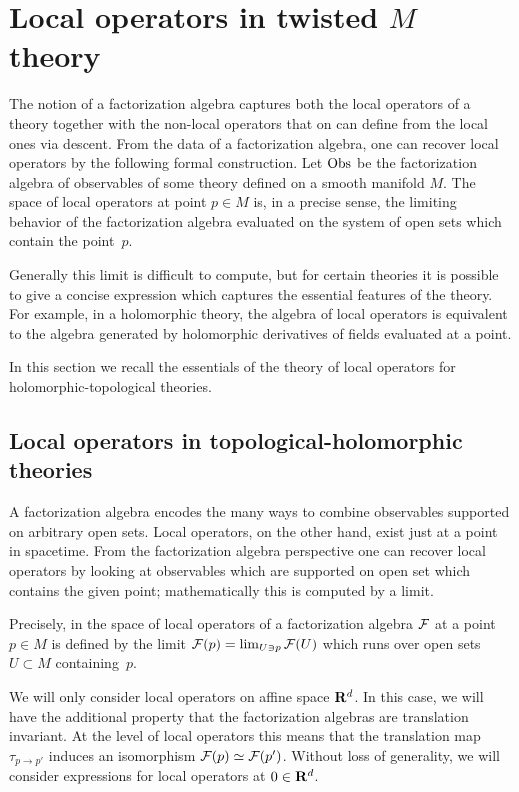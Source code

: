 %
%
%

\section{Local operators in twisted $M$ theory}

The notion of a factorization algebra captures both the local operators of a theory together with the non-local operators that on can define from the local ones via descent.
From the data of a factorization algebra, one can recover local operators by the following formal construction. 
Let $\operatorname{Obs}$ be the factorization algebra of observables of some theory defined on a smooth manifold $M$.
The space of local operators at point $p \in M$ is, in a precise sense, the limiting behavior of the factorization algebra evaluated on the system of open sets which contain the point~$p$. 

Generally this limit is difficult to compute, but for certain theories it is possible to give a concise expression which captures the essential features of the theory.
For example, in a holomorphic theory, the algebra of local operators is equivalent to the algebra generated by holomorphic derivatives of fields evaluated at a point.

In this section we recall the essentials of the theory of local operators for holomorphic-topological theories. 

\subsection{Local operators in topological-holomorphic theories}

A factorization algebra encodes the many ways to combine observables supported on arbitrary open sets. 
Local operators, on the other hand, exist just at a point in spacetime.
From the factorization algebra perspective one can recover local operators by looking at observables which are supported on  open set which contains the given point; mathematically this is computed by a limit. 

Precisely, in \cite[Definition 10.1.0.1]{CG2} the space of local operators of a factorization algebra $\mathcal F$ at a point $p \in M$ is defined by the limit $\mathcal F(p) = \lim_{U \ni p} \mathcal F(U)$ which runs over open sets $U \subset M$ containing~$p$.

We will only consider local operators on affine space $\mathbf{R}^d$. 
In this case, we will have the additional property that the factorization algebras are translation invariant.
At the level of local operators this means that the translation map $\tau_{p \to p'}$ induces an isomorphism $\mathcal F(p) \simeq \mathcal F(p')$. 
Without loss of generality, we will consider expressions for local operators at $0 \in \mathbf{R}^d$.

